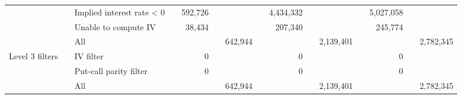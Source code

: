 \begin{tabular}{*{4}{l} *{11}{r} }
				  & & Implied interest rate < 0 & &
				592,726 & &  & &
				4,434,332 & &  & &
				5,027,058 & &  \\
			
				  & & Unable to compute IV & &
				38,434 & &  & &
				207,340 & &  & &
				245,774 & &  \\
			
				  & & All & &
				 & & 642,944 & &
				 & & 2,139,401 & &
				 & & 2,782,345 \\
			
				Level 3 filters & & IV filter & &
				0 & &  & &
				0 & &  & &
				0 & &  \\
			
				  & & Put-call parity filter & &
				0 & &  & &
				0 & &  & &
				0 & &  \\
			
				  & & All & &
				 & & 642,944 & &
				 & & 2,139,401 & &
				 & & 2,782,345 \\
			

	        \hline
	    \end{tabular}
	